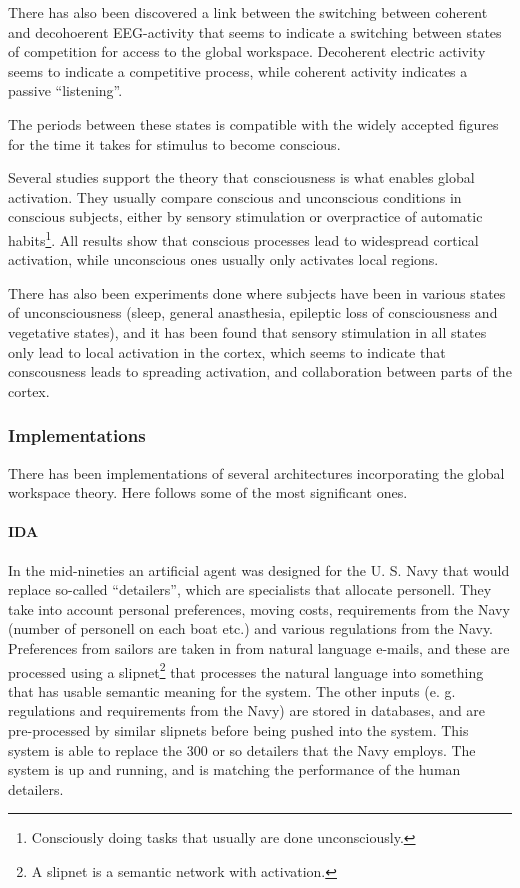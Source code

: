 There has also been discovered a link between the switching between coherent and decohoerent EEG-activity that seems to indicate a switching between states of competition for access to the global workspace. Decoherent electric activity seems to indicate a competitive process, while coherent activity indicates a passive ``listening''.\cite{freeman2003neurobiological}

The periods between these states is compatible with the widely accepted figures for the time it takes for stimulus to become conscious.\cite{shanahan2005applying}

Several studies support the theory that consciousness is what enables global activation. They usually compare conscious and unconscious conditions in conscious subjects, either by sensory stimulation or overpractice of automatic habits\footnote{Consciously doing tasks that usually are done unconsciously.}. All results show that conscious processes lead to widespread cortical activation, while unconscious ones usually only activates local regions.\cite{baars2003brain}

There has also been experiments done where subjects have been in various states of unconsciousness (sleep, general anasthesia, epileptic loss of consciousness and vegetative states), and it has been found that sensory stimulation in all states only lead to local activation in the cortex, which seems to indicate that conscousness leads to spreading activation, and collaboration between parts of the cortex.\cite{shanahan2005applying}

\subsubsection{Implementations}
There has been implementations of several architectures incorporating the global workspace theory. Here follows some of the most significant ones.

\paragraph{IDA}
In the mid-nineties an artificial agent was designed for the U. S. Navy that would replace so-called ``detailers'', which are specialists that allocate personell. They take into account personal preferences, moving costs, requirements from the Navy (number of personell on each boat etc.) and various regulations from the Navy. Preferences from sailors are taken in from natural language e-mails, and these are processed using a slipnet\footnote{A slipnet is a semantic network with activation.} that processes the natural language into something that has usable semantic meaning for the system. The other inputs (e. g. regulations and requirements from the Navy) are stored in databases, and are pre-processed by similar slipnets before being pushed into the system. This system is able to replace the 300 or so detailers that the Navy employs. The system is up and running, and is matching the performance of the human detailers. \cite{baars2007architectural}\cite{franklin1998ida}

